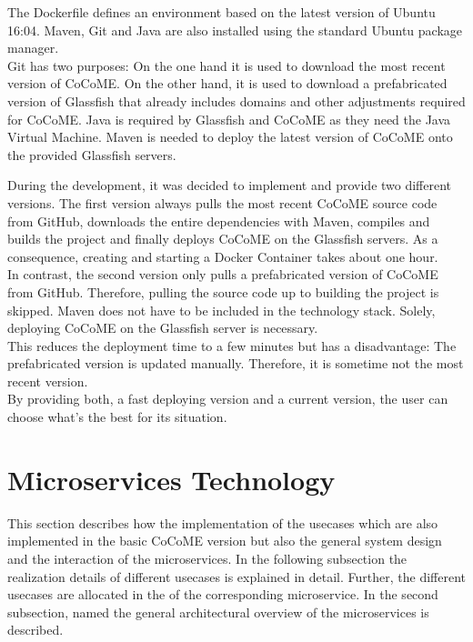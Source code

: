 The Dockerfile defines an environment based on the latest version of Ubuntu 16:04. Maven, Git and Java are also installed using the standard Ubuntu package manager.\\
Git has two purposes: On the one hand it is used to download the most recent version of CoCoME.	On the other hand, it is used to download a prefabricated version of Glassfish that already includes domains and other adjustments required for CoCoME. Java is required by Glassfish and CoCoME as they need the Java Virtual Machine. Maven is needed to deploy the latest version of CoCoME onto the provided Glassfish servers.
	
	
	During the development, it was decided to implement and provide two different versions. The first version always pulls the most recent CoCoME source code from GitHub, downloads the entire dependencies with Maven, compiles and builds the project and finally deploys CoCoME on the Glassfish servers. As a consequence, creating and starting a Docker Container takes about one hour.\\
	In contrast, the second version only pulls a prefabricated version of CoCoME from GitHub. 
	Therefore, pulling the source code up to building the project is skipped. Maven does not have to be included in the technology stack. Solely, deploying CoCoME on the Glassfish server is necessary.\\
	This reduces the deployment time to a few minutes but has a disadvantage: The prefabricated version is updated manually. Therefore, it is sometime not the most recent version.\\
	By providing both, a fast deploying version and a current version, the user can choose what's the best for its situation.
	

	

	
\section{Microservices Technology} \label{MS}
	This section describes how the implementation of the usecases which are also implemented in the basic CoCoME version but also the general system design and the interaction of the microservices. In the following subsection  the realization details of different usecases is explained in detail. Further, the different usecases are allocated in the of the corresponding microservice. In the second subsection, named  the general architectural overview of the microservices is described.
	
